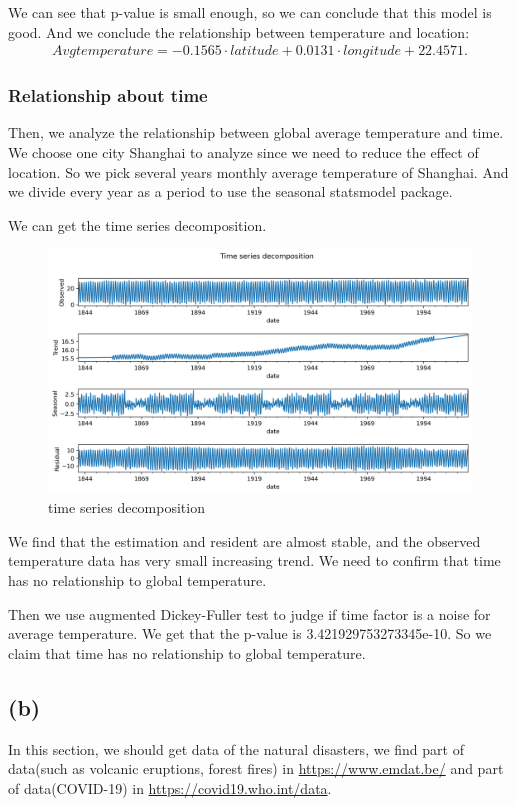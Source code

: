 \documentclass{apmcmthesis}
\begin{document}
We can see that p-value is small enough, so we can conclude that this model is good.
And we conclude the relationship between temperature and location:
\begin{align*}
  Avgtemperature =-0.1565\cdot latitude+0.0131\cdot longitude + 22.4571.
\end{align*}

\subsubsection{Relationship about time}
Then, we analyze the relationship between global average temperature and time.
We choose one city Shanghai to analyze since we need to reduce the effect of location.
So we pick several years monthly average temperature of Shanghai.
And we divide every year as a period to use the seasonal statsmodel package.

We can get the time series decomposition.

\begin{figure}[htbp]
  \centering
  \includegraphics[scale=0.5]{seasonal.png}
  \caption{time series decomposition}\label{fig12}
\end{figure}

We find that the estimation and resident are almost stable, and the observed temperature data has very small increasing trend. 
We need to confirm that time has no relationship to global temperature.

Then we use augmented Dickey-Fuller test to judge if time factor is a noise for average temperature.
We get that the p-value is 3.421929753273345e-10.
So we claim that time has no relationship to global temperature.


\subsection{(b)}
In this section, we should get data of the natural disasters, we find part of data(such as volcanic eruptions, forest fires) in \url{https://www.emdat.be/} and part of data(COVID-19) in \url{https://covid19.who.int/data}.
\end{document}
